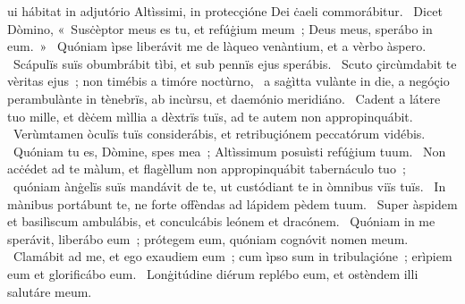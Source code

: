 { }
{%
ui hábitat in adjutório Altìssimi, in protecçióne Dei ċaeli commorábitur. 
~Dicet Dòmino, «~Susċèptor meus es tu, et refúġium meum~; Deus meus, sperábo in eum.~»
~Quóniam ìpse liberávit me de làqueo venàntium, et a vèrbo àspero. 
~Scápulïs suïs obumbrábit tìbi, et sub pennïs ejus sperábis. 
~Scuto çircùmdabit te vèritas ejus~; non timébis a timóre noctùrno, 
~a saġìtta vulànte in die, a negóçio perambulànte in tènebrïs, ab incùrsu, et daemónio meridiáno. 
~Cadent a látere tuo mille, et dèċem mìllia a dèxtrïs tuïs, ad te autem non appropinquábit. 
~Verùmtamen òculïs tuïs considerábis, et retribuçiónem peccatórum vidébis. 
~Quóniam tu es, Dòmine, spes mea~; Altìssimum posuìsti refúġium tuum. 
~Non acċédet ad te màlum, et flagèllum non appropinquábit tabernáculo tuo~; 
~quóniam ànġelïs suïs mandávit de te, ut custódiant te in òmnibus viïs tuïs. 
~In mànibus portábunt te, ne forte offèndas ad lápidem pèdem tuum. 
~Super àspidem et basilìscum ambulábis, et conculcábis leónem et dracónem. 
~Quóniam in me sperávit, liberábo eum~; prótegem eum, quóniam cognóvit nomen meum. 
~Clamábit ad me, et ego exaudiem eum~; cum ìpso sum in tribulaçióne~; erìpiem eum et glorificábo eum. 
~Lonġitúdine diérum replébo eum, et ostèndem illi salutáre meum. 
}
